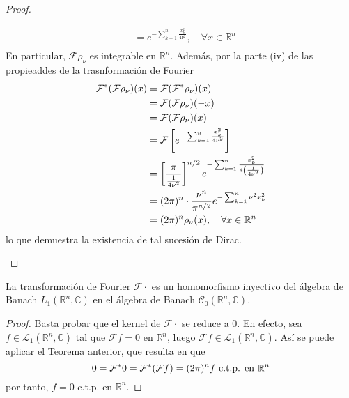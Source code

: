 \documentclass[12pt]{report}
\newcounter{it}
\theoremstyle{largebreak}
\newcommand{\fou}[1]{\ensuremath{\mathcal{F}#1}}
\begin{document}
\begin{proof}
\begin{enumerate}
\begin{equation*}
\begin{split}
                    &=e^{ -\sum_{ k=1}^n \frac{x_k^2}{4\nu^2}},\quad\forall x\in\mathbb{R}^n \\
                \end{split}
            \end{equation*}
            En particular, $\fou{\rho_\nu}$ es integrable en $\mathbb{R}^n$. Además, por la parte (iv) de las propieaddes de la trasnformación de Fourier
            \begin{equation*}
                \begin{split}
                    \fou^*{(\fou{\rho_\nu})}(x)&=\fou{(\fou^*{\rho_\nu})}(x)\\
                    &=\fou{(\fou{\rho_\nu})}(-x)\\
                    &=\fou{(\fou{\rho_\nu})}(x)\\
                    &=\fou{\left[e^{ -\sum_{ k=1}^n \frac{x_k^2}{4\nu^2}} \right]}\\
                    &=\left[\frac{\pi}{\frac{1}{4\nu^2}}\right]^{ n/2}e^{-\sum_{ k=1}^n \frac{x_k^2}{4\left(\frac{1}{4\nu^2}\right)}}\\
                    &=(2\pi)^n\cdot\frac{\nu^n}{\pi^{n/2}}e^{ -\sum_{ k=1}^n \nu^2 x_k^2}\\
                    &=(2\pi)^n\rho_\nu(x),\quad\forall x\in\mathbb{R}^n\\
                \end{split}
            \end{equation*}
            lo que demuestra la existencia de tal sucesión de Dirac.
        \end{enumerate}
    \end{proof}

    \begin{propo}
        La transformación de Fourier $\fou{\cdot}$ es un homomorfismo inyectivo del álgebra de Banach $L_1(\mathbb{R}^n,\mathbb{C})$ en el álgebra de Banach $\mathcal{C}_0(\mathbb{R}^n,\mathbb{C})$.
    \end{propo}

    \begin{proof}
        Basta probar que el kernel de $\fou{\cdot}$ se reduce a $0$. En efecto, sea $f\in\mathcal{L}_1(\mathbb{R}^n,\mathbb{C})$ tal que $\fou{f}=0$ en $\mathbb{R}^n$, luego $\fou{f}\in\mathcal{L}_1(\mathbb{R}^n,\mathbb{C})$. Así se puede aplicar el Teorema anterior, que resulta en que
        \begin{equation*}
            0=\fou^*{0}=\fou^*{(\fou{f})}=(2\pi)^nf\textup{ c.t.p. en }\mathbb{R}^n
        \end{equation*}
        por tanto, $f=0$ c.t.p. en $\mathbb{R}^n$.
    \end{proof}
\end{document}
